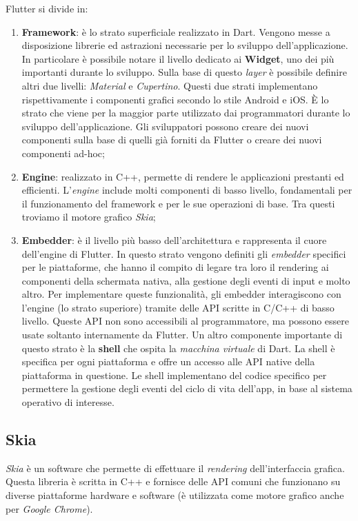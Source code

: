 Flutter si divide in:
\begin{enumerate}
	\item \textbf{Framework}: è lo strato superficiale realizzato in Dart. Vengono messe a disposizione librerie ed astrazioni necessarie per lo sviluppo dell'applicazione. In particolare è possibile notare il livello dedicato ai \textbf{Widget}, uno dei più importanti durante lo sviluppo. Sulla base di questo \textit{layer} è possibile definire altri due livelli: \textit{Material} e \textit{Cupertino}. Questi due strati implementano rispettivamente i componenti grafici secondo lo stile Android e iOS. È lo strato che viene per la maggior parte utilizzato dai programmatori durante lo sviluppo dell'applicazione. Gli sviluppatori possono creare dei nuovi componenti sulla base di quelli già forniti da Flutter o creare dei nuovi componenti ad-hoc;	
	\item \textbf{Engine}: realizzato in C++, permette di rendere le applicazioni prestanti ed efficienti. L'\textit{engine} include molti componenti di basso livello, fondamentali per il funzionamento del framework e per le sue operazioni di base. Tra questi troviamo il motore grafico \textit{Skia};
	\item \textbf{Embedder}: è il livello più basso dell’architettura e rappresenta il cuore dell'engine di Flutter. In questo strato vengono definiti gli \textit{embedder} specifici per le piattaforme, che hanno il compito di legare tra loro il rendering ai componenti della schermata nativa, alla gestione degli eventi di input e molto altro. Per implementare queste funzionalità, gli embedder interagiscono con l'engine (lo strato superiore) tramite delle API scritte in C/C++ di basso livello. Queste API non sono accessibili al programmatore, ma possono essere usate soltanto internamente da Flutter. Un altro componente importante di questo strato è la \textbf{shell} che ospita la \textit{macchina virtuale} di Dart. La shell è specifica per ogni piattaforma e offre un accesso alle API native della piattaforma in questione. Le shell implementano del codice specifico per permettere la gestione degli eventi del ciclo di vita dell’app, in base al sistema operativo di interesse.
\end{enumerate}

\subsection{Skia}
\textit{Skia} \cite{skia} è un software che permette di effettuare il \textit{rendering} dell'interfaccia grafica. Questa libreria è scritta in C++ e fornisce delle API comuni che funzionano su diverse piattaforme hardware e software (è utilizzata come motore grafico anche per \textit{Google Chrome}).

